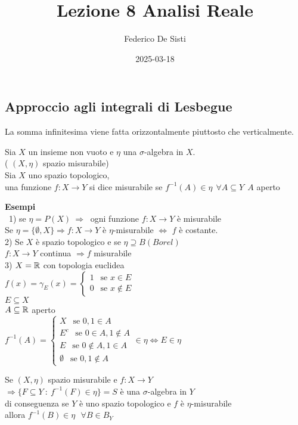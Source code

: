 \documentclass[12px]{article}
\title{Lezione 8 Analisi Reale}
\date{2025-03-18}
\author{Federico De Sisti}
\begin{document}
	\maketitle
	\newpage
	\subsection{Approccio agli integrali di Lesbegue}
	La somma infinitesima viene fatta orizzontalmente piuttosto che verticalmente.
	\begin{defi}
		Sia $X$ un insieme non vuoto e $\eta$ una  $\sigma$-algebra in $X$.\\
		( $(X,\eta)$ spazio misurabile)\\
		Sia $X$ uno spazio topologico,\\
		una funzione $f: X \rightarrow Y$ si dice misurabile se $f^{-1} (A)\in \eta \ \ \forall A\subseteq Y \ \ A$ aperto
	\end{defi}
	\textbf{Esempi}\\\
	1) se $\eta = P(X)\ \Rightarrow \ $ ogni funzione $f: X \rightarrow Y$ è misurabile\\
 Se $\eta = \{\emptyset, X\} \Rightarrow f:X \rightarrow Y$ è $\eta$-misurabile $ \Leftrightarrow$ $f$ è costante.\\
	2) Se $X$ è spazio topologico  e se $\eta\supseteq B (Borel)$\\
	 $f : X \rightarrow Y$ continua $ \Rightarrow  f$ misurabile\\
	 3) $X= \mathbb{R}$ con topologia euclidea\\
	  $f(x) = \gamma_E(x) = \begin{cases}
		  1 \ \ \text{ se }  x \in E\\
		  0 \ \ \text{ se }  x \not\in E
	  \end{cases}$ \\
	  $E\subseteq X$\\
	   $A\subseteq \mathbb{R}$ aperto\\
	   $f^{-1}(A) = \begin{cases}
		   X \ \ \text{ se } 0,1\in A\\
		   E^c \ \ \text{ se } 0\in A, 1\not\in A\\
		   E \ \ \text{ se } 0\not \in A,1\in A\\
		   \emptyset \ \ \text{ se } 0,1\not\in A
	   \end{cases}\in\eta \Leftrightarrow E\in \eta$\\
	   \begin{prop}
	   	Se $(X,\eta)$ spazio misurabile e $f:X \rightarrow Y$\\
		$ \Rightarrow  \{F\subseteq Y \ : \ f^{-1}(F)\in\eta\} =S$ è una $\sigma$-algebra in $Y$ \\
		di conseguenza se $Y$ è uno spazio topologico e $f$ è $\eta$-misurabile\\
		allora $f ^{-1}(B)\in\eta \ \ \ \forall B\in B_Y$
	   \end{prop}
\end{document}

